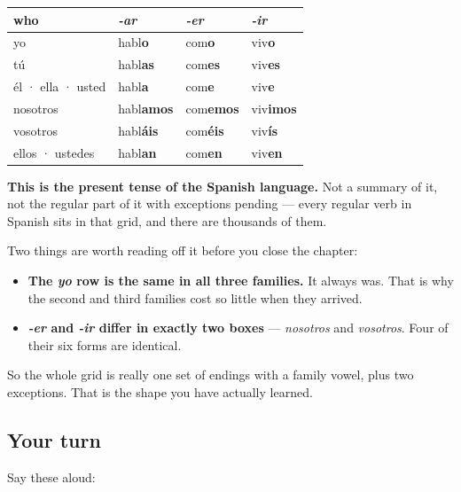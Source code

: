 \begin{grammarlens}[title={Grammar Lens: eighteen forms, and you built each one}]
\noindent
\begin{tabularx}{\linewidth}{@{}>{\raggedright\arraybackslash}X>{\raggedright\arraybackslash}X>{\raggedright\arraybackslash}X>{\raggedright\arraybackslash}X@{}}
\toprule
\textbf{who} & \textbf{\emph{-ar}} & \textbf{\emph{-er}} & \textbf{\emph{-ir}} \\
\midrule
yo & habl\textbf{o} & com\textbf{o} & viv\textbf{o} \\
tú & habl\textbf{as} & com\textbf{es} & viv\textbf{es} \\
él · ella · usted & habl\textbf{a} & com\textbf{e} & viv\textbf{e} \\
nosotros & habl\textbf{amos} & com\textbf{emos} & viv\textbf{imos} \\
vosotros & habl\textbf{áis} & com\textbf{éis} & viv\textbf{ís} \\
ellos · ustedes & habl\textbf{an} & com\textbf{en} & viv\textbf{en} \\
\bottomrule
\end{tabularx}

\textbf{This is the present tense of the Spanish language.} Not a summary of it, not the regular part of it with exceptions pending — every regular verb in Spanish sits in that grid, and there are thousands of them.

Two things are worth reading off it before you close the chapter:

\begin{itemize}
\raggedright
  \item \textbf{The \emph{yo} row is the same in all three families.} It always was. That is why the second and third families cost so little when they arrived.
  \item \textbf{\emph{-er} and \emph{-ir} differ in exactly two boxes} — \emph{nosotros} and \emph{vosotros}. Four of their six forms are identical.
\end{itemize}

So the whole grid is really one set of endings with a family vowel, plus two exceptions. That is the shape you have actually learned.
\end{grammarlens}

\subsection*{Your turn}
Say these aloud:

